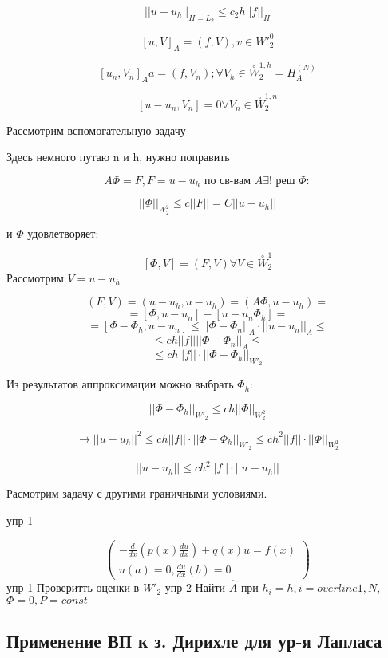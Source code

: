 \documentclass[12pt, a4paper]{article}
\begin{document}
\[ {||u-u_h||}_{H=L_2} \leq c_2 h {||f||}_H \]

\[ {[u, V]}_A = (f, V), v \in {W'}^0_2 \]

\[ {[u_n, V_n]}_Aa = (f, V_n);  \forall V_h \in \overset{\circ}{W}_2^{1, h} = H_A^{(N)} \]

\[ [u - u_n, V_n] = 0 \forall V_n \in \overset{\circ}{W}_2^{1, n} \]

Рассмотрим вспомогательную задачу

Здесь немного путаю n и h, нужно поправить

\[ A \Phi = F, F = u - u_h \textrm{ по св-вам } A \exists! \textrm{ реш } \Phi: \]

\[ ||\Phi||_{W^2_2} \leq c ||F|| = C ||u - u_h|| \]

и $ \Phi $ удовлетворяет:

\[ [\Phi, V] = (F, V) \forall V \in \overset{\circ}{W}^1_2 \]
Рассмотрим $ V=u - u_h $

\[ (F, V) = (u - u_h, u - u_h) = (A \Phi, u - u_h) = \]
\[ = [\Phi, u - u_n] - [u - u_n \Phi_h] = \]
\[ = [\Phi - \Phi_h, u - u_n] \leq {||\Phi - \Phi_n||}_A \cdot {||u - u_n||}_A \leq \]
\[ \leq ch ||f|| {||\Phi - \Phi_n||}_A \leq \]
\[ \leq ch ||f|| \cdot {||\Phi - \Phi_h||}_{{W'}_2} \]

Из результатов аппроксимации можно выбрать $ \Phi_h $:

\[ {||\Phi - \Phi_h||}_{{W'}_2} \leq ch {||\Phi||}_{W^2_2} \]

\[ \rightarrow {||u-u_h||}^2 \leq ch {||f||} \cdot {||\Phi- \Phi_h||}_{{W'}_2} \leq ch^2 ||f|| \cdot {||\Phi||}_{W_2^2}  \]

\[ ||u - u_h|| \leq ch^2 ||f|| \cdot ||u - u_h|| \]

Расмотрим задачу с другими граничными условиями.

упр 1

\[
\left(
    \begin{array}{c}
        -\frac{d}{dx} (p(x) \frac{du}{dx}) + q(x) u = f(x) \\
        u(a) = 0, \frac{du}{dx}(b) = 0
    \end{array}
\right)
\]
упр 1 Проверитть оценки в $ {W'}_2 $
упр 2 Найти $ \hat{A} $ при $ h_i = h, i = overline{1, N} $,
$ \Phi = 0, P = const $

\subsection{Применение ВП к з. Дирихле для ур-я Лапласа}
\end{document}
